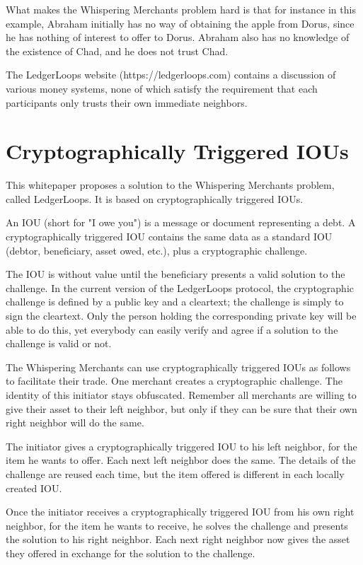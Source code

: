 \documentclass[11pt,twoside,a4paper]{article}
\begin{document}
What makes the Whispering Merchants problem hard is that for instance in this example, Abraham initially has no way of obtaining the apple from Dorus, since he has nothing of interest to offer to Dorus. Abraham also has no knowledge of the existence of Chad, and he does not trust Chad.

The LedgerLoops website (https://ledgerloops.com) contains a discussion of various money systems, none of which satisfy the requirement that each participants only trusts their own immediate neighbors.

\section{Cryptographically Triggered IOUs}
This whitepaper proposes a solution to the Whispering Merchants problem, called LedgerLoops. It is based on cryptographically triggered IOUs.

An IOU (short for "I owe you") is a message or document representing a debt.
A cryptographically triggered IOU contains the same data as a standard IOU (debtor, beneficiary, asset owed, etc.), plus a cryptographic challenge.

The IOU is without value until the beneficiary presents a valid solution to the challenge. In the current version of the LedgerLoops protocol, the cryptographic challenge is defined by a public key and a clear\-text; the challenge is simply to sign the clear\-text. Only the person holding the corresponding private key will be able to do this, yet everybody can easily verify and agree if a solution to the challenge is valid or not.

The Whispering Merchants can use cryptographically triggered IOUs as follows to facilitate their trade. One merchant creates a cryptographic challenge. The identity of this initiator stays obfuscated. Remember all merchants are willing to give their asset to their left neighbor, but only if they can be sure that their own right neighbor will do the same.

The initiator gives a cryptographically triggered IOU to his left neighbor, for the item he wants to offer. Each next left neighbor does the same. The details of the challenge are reused each time, but the item offered is different in each locally created IOU.

Once the initiator receives a cryptographically triggered IOU from his own right neighbor, for the item he wants to receive, he solves the challenge and presents the solution to his right neighbor. Each next right neighbor now gives the asset they offered in exchange for the solution to the challenge.
\end{document}
